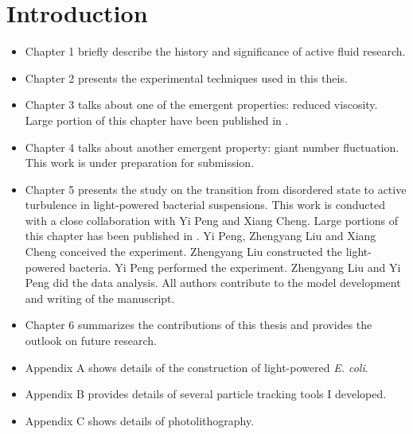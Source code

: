 



\chapter{Introduction}
\label{intro_chapter}

\begin{itemize}

\item Chapter 1 briefly describe the history and significance of active fluid research.

\item Chapter 2 presents the experimental techniques used in this theis.

\item Chapter 3 talks about one of the emergent properties: reduced viscosity. Large portion of  this chapter have been published in \cite{Liu2019}.

\item Chapter 4 talks about another emergent property: giant number fluctuation. This work is under preparation for submission.

\item Chapter 5 presents the study on the transition from disordered state to active turbulence in light-powered bacterial suspensions. This work is conducted with a close collaboration with Yi Peng and Xiang Cheng. Large portions of this chapter has been published in \cite{Peng2020}. Yi Peng, Zhengyang Liu and Xiang Cheng conceived the experiment. Zhengyang Liu constructed the light-powered bacteria. Yi Peng performed the experiment. Zhengyang Liu and Yi Peng did the data analysis. All authors contribute to the model development and writing of the manuscript.

\item Chapter 6 summarizes the contributions of this thesis and provides the outlook on future research.

\item Appendix A shows details of the construction of light-powered \textit{E. coli}.

\item Appendix B provides details of several particle tracking tools I developed.

\item Appendix C shows details of photolithography.

\end{itemize}


